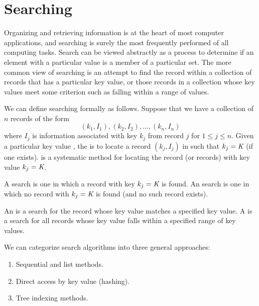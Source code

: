 
\chapter{Searching}
\label{Search}
\def\CHHEAD{Chap.\ \thechapter\ Searching}    %


Organizing and retrieving information is at the heart of most computer
applications, and searching is surely the most frequently performed
of all computing tasks.
Search can be viewed abstractly as a process to determine if
an element with a particular value is a member of a particular set.
The more common view of searching is an attempt to
find the record within a collection of records that has
a particular key value, or those records in a collection whose key
values meet some criterion such as falling within a range of
values.

We can define searching formally as follows.
Suppose that we have a collection  of \(n\) records of the
form
\[ (k_1, I_1), (k_2, I_2), ..., (k_n, I_n) \]
where \(I_j\) is information associated with key \(k_j\)
from record \(j\) for \( 1 \leq j \leq n \).
Given a particular key value ,
the  is to locate a record
\( (k_j, I_j) \) in  such that \(k_j = {\textit{K}}\)
(if one exists).
 is a systematic method for
locating the record (or records) with key value \(k_j = {\textit{K}}\).

A  search is one in which a record with key
\(k_j = {\textit{K}}\) is found.
An  search is one in which no record with
\(k_j = {\textit{K}}\) is found (and no such record
exists).

An  is a search for the record whose key
value matches a specified key value.
A  is a search for all records whose key value
falls within a specified range of key values.

We can categorize search algorithms into three general
approaches:

\begin{enumerate}
\item
Sequential and list methods.
\item
Direct access by key value (hashing).
\item
Tree indexing methods.
\end{enumerate}

